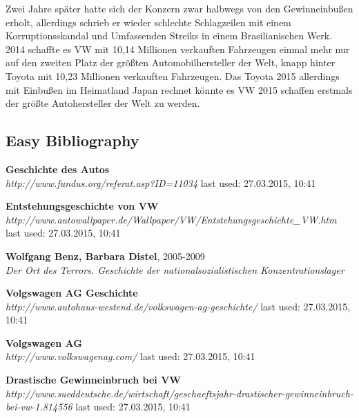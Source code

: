 \documentclass[12pt]{article}
\begin{document}
Zwei Jahre später hatte sich der Konzern zwar halbwegs von den Gewinneinbußen erholt, allerdings schrieb er wieder schlechte Schlagzeilen mit einem Korruptionsskandal und Umfassenden Streiks in einem Brasilianischen Werk. \cite{autowp}\\
2014 schaffte es VW mit 10,14 Millionen verkauften Fahrzeugen einmal mehr nur auf den zweiten Platz der größten Automobilhersteller der Welt, knapp hinter Toyota mit 10,23 Millionen verkauften Fahrzeugen. Das Toyota 2015 allerdings mit Einbußen im Heimatland Japan rechnet könnte es VW 2015 schaffen erstmals der größte Autohersteller der Welt zu werden.




\newpage
\listoftables
\listoffigures
\printglossaries
\subsection{Easy Bibliography}
\begin{thebibliography}{56}


  
  \textbf{Geschichte des Autos} \\
  \textit{
  	  http://www.fundus.org/referat.asp?ID=11034
  }
  \newline last used: 27.03.2015, 10:41

    
\textbf{Entstehungsgeschichte von VW} \\
\textit{
http://www.autowallpaper.de/Wallpaper/VW/Entstehungsgeschichte\_VW.htm
}
\newline last used: 27.03.2015, 10:41

\textbf{Wolfgang Benz, Barbara Distel}, 2005-2009 \\
\textit{
Der Ort des Terrors. Geschichte der nationalsozialistischen Konzentrationslager
}


\textbf{Volgswagen AG Geschichte} \\
\textit{
http://www.autohaus-westend.de/volkswagen-ag-geschichte/
}
\newline last used: 27.03.2015, 10:41

\textbf{Volgswagen AG} \\
\textit{
http://www.volkswagenag.com/
}
\newline last used: 27.03.2015, 10:41

\textbf{Drastische Gewinneinbruch bei VW} \\
\textit{
http://www.sueddeutsche.de/wirtschaft/geschaeftsjahr-drastischer-gewinneinbruch-bei-vw-1.814556
}
\newline last used: 27.03.2015, 10:41



  
  
\end{thebibliography}
\end{document}
